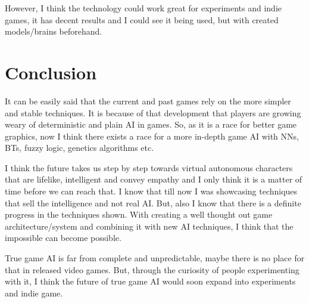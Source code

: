 \documentclass[a4paper, 12pt]{book}
\begin{document}
However, I think the technology could work great for experiments and indie games, it has decent results and I could see it being used, but with created models/brains beforehand.

\chapter{Conclusion}
\label{ch4}

It can be easily said that the current and past games rely on the more simpler and stable techniques. It is because of that development that players are growing weary of deterministic and plain AI in games. So, as it is a race for better game graphics, now I think there exists a race for a more in-depth game AI with NNs, BTs, fuzzy logic, genetics algorithms etc. 

I think the future takes us step by step towards virtual autonomous characters that are lifelike, intelligent and convey empathy and I only think it is a matter of time before we can reach that. I know that till now I was showcasing techniques that sell the intelligence and not real AI. But, also I know that there is a definite progress in the techniques shown. With creating a well thought out game architecture/system and combining it with new AI techniques, I think that the impossible can become possible.

True game AI is far from complete and unpredictable, maybe there is no place for that in released video games. But, through the curiosity of people experimenting with it, I think the future of true game AI would soon expand into experiments and indie game.

\cleardoublepage
{}


\end{document}
